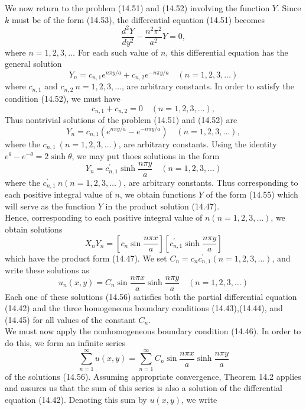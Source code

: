\documentclass[11pt,a4paper, twoside]{report}
\begin{document}
	We now return to the problem (14.51) and (14.52) involving the function $Y$. Since $k$ must be of the form (14.53), the differential equation (14.51) becomes
	$$
	\frac{d^2 Y}{dy^2} - \frac{n^2\pi^2}{a^2}Y = 0,
	$$
	where $n = 1, 2, 3, \ldots$ For each such value of $n$, this differential equation has the general solution
	$$
	Y_n = c_{n,1}e^{n\pi y/a} + c_{n,2}e^{-n\pi y/a}\quad (n = 1, 2, 3, \ldots)
	$$
	where $c_{n, 1}$ and $c_{n,2}\ n=1,2,3,\ldots$, are arbitrary constants. In order to satisfy the condition (14.52), we must have
	$$
	c_{n, 1} + c_{n,2} = 0\quad (n = 1, 2, 3, \ldots),
	$$
	Thus nontrivial solutions of the problem (14.51) and (14.52) are
	$$
	Y_n = c_{n, 1}(e^{n\pi y/a} - e^{-n\pi y/a})\quad (n=1,2,3,\ldots),
	$$
	where the $c_{n,1}\ (n=1,2,3,\ldots)$, are arbitrary constants. Using the identity $e^\theta - e^{-\theta} = 2\sinh \theta$, we may put thoes solutions in the form
	\begin{equation}\tag{14.55}
		Y_n = c^\prime_{n, 1}\sinh \frac{n\pi y}{a}\quad (n=1,2,3,\ldots)
	\end{equation}
	where the $c^\prime_{n,1}\ n(n=1,2,3,\ldots)$, are arbitrary constants. Thus corresponding  to each positive integral value of $n$, we obtain functions $Y$ of the form (14.55) which will serve as the function $Y$ in the product solution (14.47).\\
	Hence, corresponding to each positive integral value of $n(n = 1, 2, 3,\ldots)$, we obtain solutions
	$$
	X_nY_n = \left[c_n\sin\frac{n\pi x}{a}\right]\left[c^\prime_{n,1}\sinh \frac{n\pi y}{a}\right]
	$$
	which have the product form (14.47). We set $C_n = c_n c^\prime_{n,1}(n=1,2,3,\ldots)$, and write these solutions as
	\begin{equation}\tag{14.56}
		u_n(x,y) = C_n\sin\frac{n\pi x}{a}\sinh \frac{n\pi y}{a}\quad (n=1,2,3,\ldots)
	\end{equation}
	Each one of these solutions (14.56) satisfies both the partial differential equation (14.42) and the three homogeneous boundary conditions (14.43),(14.44), and (14.45) for all values of the constant  $C_n$.\\
	We must now apply the nonhomogeneous boundary condition (14.46). In order to do this, we form an infinite series
	$$
	\sum_{n=1}^\infty u(x,y) = \sum_{n=1}^\infty C_n \sin\frac{n\pi x}{a} \sinh\frac{n\pi y}{a}
	$$
	of the solutions (14.56). Assuming appropriate convergence, Theorem 14.2 applies and assures us that the sum of this series is also a solution of the differential equation  (14.42). Denoting  this sum by $u(x, y)$, we write
\end{document}

